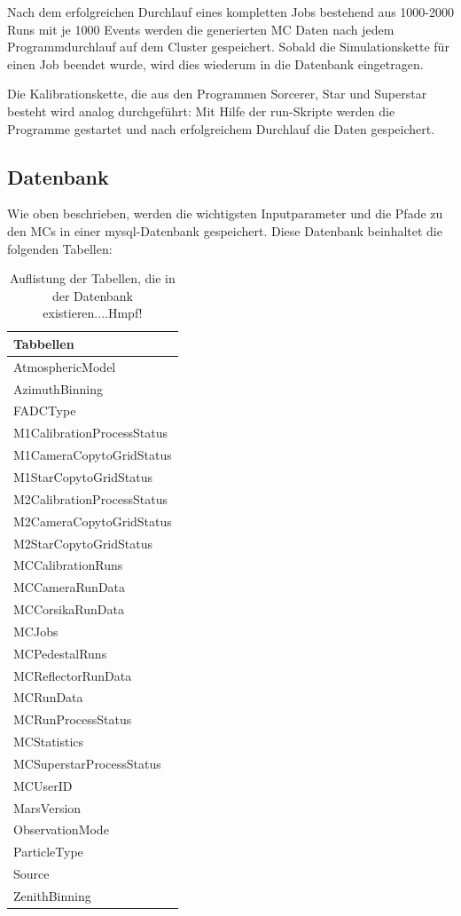 Nach dem erfolgreichen Durchlauf eines kompletten Jobs  bestehend aus 1000-2000 Runs mit je 1000 Events werden die generierten MC Daten nach jedem Programmdurchlauf auf dem Cluster gespeichert.
Sobald die Simulationskette für einen Job beendet wurde, wird dies wiederum in die Datenbank eingetragen.

Die Kalibrationskette, die aus den Programmen Sorcerer, Star und Superstar besteht wird analog durchgeführt:
Mit Hilfe der run-Skripte werden die Programme gestartet und nach erfolgreichem Durchlauf die Daten gespeichert.

\subsection{Datenbank}
Wie oben beschrieben, werden die wichtigsten Inputparameter und die Pfade zu den MCs in einer mysql-Datenbank gespeichert.
Diese Datenbank beinhaltet die folgenden Tabellen:

\begin{table}[!h]
\centering
\caption{Auflistung der Tabellen, die in der Datenbank existieren....Hmpf!}
\label{MYSQL_Tabellen}
\begin{tabular}{l}
  \toprule
  Tabbellen\\
  \midrule
  AtmosphericModel           \\
  AzimuthBinning             \\
  FADCType                   \\
  M1CalibrationProcessStatus \\
  M1CameraCopytoGridStatus   \\
  M1StarCopytoGridStatus     \\
  M2CalibrationProcessStatus \\
  M2CameraCopytoGridStatus   \\
  M2StarCopytoGridStatus     \\
  MCCalibrationRuns          \\
  MCCameraRunData            \\
  MCCorsikaRunData           \\
  MCJobs                     \\
  MCPedestalRuns             \\
  MCReflectorRunData         \\
  MCRunData                  \\
  MCRunProcessStatus         \\
  MCStatistics               \\
  MCSuperstarProcessStatus   \\
  MCUserID                   \\
  MarsVersion                \\
  ObservationMode            \\
  ParticleType               \\
  Source                     \\
  ZenithBinning   	     \\
  \bottomrule
\end{tabular}
\end{table}

